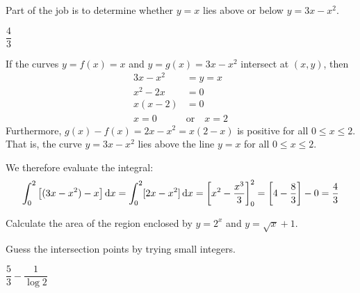 \begin{hint}
Part of the job is to determine whether $y=x$ lies above or below
$y=3x-x^2$.
\end{hint}

\begin{answer}
$\dfrac{4}{3}$
\end{answer}

\begin{solution}
If the curves $y=f(x)=x$ and $y=g(x)=3x-x^2$ intersect at $(x,y)$, then
\begin{align*}
3x-x^2&=y=x\\
x^2-2x&=0\\
x(x-2)&=0\\
x=0 \quad &\mbox{or} \quad x=2
\end{align*}
Furthermore, $g(x)-f(x) = 2x-x^2 = x(2-x)$ is positive for all $0\le x\le 2$.
That is, the curve  $y=3x-x^2$ lies above the line $y=x$ for all $0\le x\le 2$.

\begin{center}
\end{center}

We therefore evaluate the integral:
\begin{align*}
 \int_0^2 \big[ (3x-x^2) - x \big] \,\mathrm{d}x
  = \int_0^2 [2x-x^2]\,\mathrm{d}x
   = \bigg[x^2 - \frac{x^3}{3}\bigg]^{2}_{0}
   = \bigg[ 4-\frac{8}{3} \bigg] -0
   = \frac{4}{3}
\end{align*}
\end{solution}



\begin{question}[2015A]
Calculate the area of the region enclosed by $y = 2^x$ and $y = \sqrt x+1$.
\end{question}

\begin{hint}
Guess the intersection points by trying small integers.
\end{hint}

\begin{answer}
$\dfrac{5}{3}-\dfrac{1}{\log 2}$
\end{answer}

